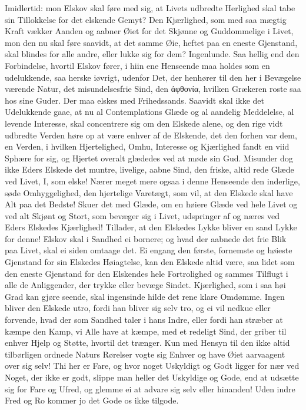 \documentclass[12pt,a4paper]{book}
\newcommand{\apage}[1]{\marginnote{\footnotesize\textit{[#1]}}}
\begin{document}
Imidlertid: mon Elskov skal føre med sig, at Livets udbredte Herlighed
skal tabe sin Tillokkelse for det elskende Gemyt? Den Kjærlighed, som
med saa mægtig Kraft vækker Aanden og aabner Øiet for det Skjønne og
Guddommelige i Livet, mon den nu skal føre saavidt, at det samme Øie,
heftet paa en eneste Gjenstand, skal blindes for alle andre, eller lukke
sig for dem? Ingenlunde. Saa hellig end den Forbindelse, hvortil Elskov
fører, i hiin ene Henseende maa holdes som en udelukkende, saa herske
iøvrigt, udenfor Det, der henhører til den her i Bevægelse værende
Natur, det misundelsesfrie Sind, den ἀφθονία, hvilken Grækeren roste saa
hos sine Guder. Der maa elskes med Frihedssands. Saavidt skal ikke det
Udelukkende gaae, at nu al Contemplations Glæde og al aandelig
Meddelelse, al levende Interesse, skal concentrere sig om den Elskede
alene, og den rige vidt udbredte Verden høre op at være enhver af de
Elskende, det den forhen var dem, en Verden, i hvilken Hjertelighed,
Omhu, Interesse og Kjærlighed fandt en viid Sphære for sig, og Hjertet
overalt glædedes ved at møde sin Gud. Misunder \apage{66} dog ikke Eders Elskede
det muntre, livelige, aabne Sind, den friske, altid rede Glæde ved
Livet, I, som elske! Nærer meget mere ogsaa i denne Henseende den
inderlige, søde Omhyggelighed, den hjertelige Varetægt, som vil, at den
Elskede skal have Alt paa det Bedste! Skuer det med Glæde, om en høiere
Glæde ved hele Livet og ved alt Skjønt og Stort, som bevæger sig i
Livet, udspringer af og næres ved Eders Elskedes Kjærlighed! Tillader,
at den Elskedes Lykke bliver en sand Lykke for denne! Elskov skal i
Sandhed ei bornere; og hvad der aabnede det frie Blik paa Livet, skal ei
siden omtaage det. Ei engang den første, fornemste og høieste Gjenstand
for sin Elskedes Høiagtelse, kan den Elskede altid være, saa lidet som
den eneste Gjenstand for den Elskendes hele Fortrolighed og sammes
Tilflugt i alle de Anliggender, der trykke eller bevæge Sindet.
Kjærlighed, som i saa høi Grad kan gjøre seende, skal ingensinde hilde
det rene klare Omdømme. Ingen bliver den Elskede utro, fordi han bliver
sig selv tro, og ei vil nedkue eller forvende, hvad der som Sandhed
taler i hans Indre, eller fordi han stræber at kæmpe den Kamp, vi Alle
have at kæmpe, med et redeligt Sind, der griber til enhver Hjelp og
Støtte, hvortil det trænger. Kun med Hensyn til den ikke altid
tilbørligen ordnede Naturs Rørelser vogte sig Enhver og have Øiet
aarvaagent over sig selv! Thi her er Fare, og hvor noget Uskyldigt og
Godt ligger for nær ved Noget, der ikke er godt, slippe man heller det
Uskyldige og Gode, end \apage{67} at udsætte sig for Fare og Ufred, og glemme ei at
advare sig selv eller hinanden! Uden indre Fred og Ro kommer jo det Gode
os ikke tilgode.
\end{document}
